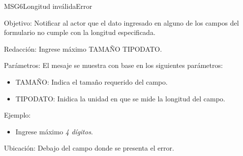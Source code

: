 \begin{mensaje}{MSG6}{Longitud inválida}{Error}
	\item [Objetivo:] Notificar al actor que el dato ingresado en alguno de los campos del formulario no cumple con la longitud especificada.
	\item[Redacción:] Ingrese máximo TAMAÑO TIPODATO.
	\item[Parámetros:] El mesaje se muestra con base en los siguientes parámetros:
		\begin{itemize}
 			\item TAMAÑO: Indica el tamaño requerido del campo.
 			\item TIPODATO: Inidica la unidad en que se mide la longitud del campo.
		\end{itemize}
	\item[Ejemplo:] 
	\begin{itemize}
		\item Ingrese máximo {\em 4 dígitos}.
	\end{itemize}
	\item [Ubicación:] Debajo del campo donde se presenta el error.
\end{mensaje}